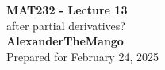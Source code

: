 \begin{titlepage}
    \null %
    \vfill
    \begin{center}
        {\fontsize{40}{48}\selectfont \bfseries MAT232 - Lecture 13}
        \vspace{20pt} \\
        {\LARGE after partial derivatives?} \\
        \vspace{20pt}
        \textbf{AlexanderTheMango}
        \vspace{8pt}
        \\ Prepared for February 24, 2025
    \end{center}
    \vfill
\end{titlepage}

